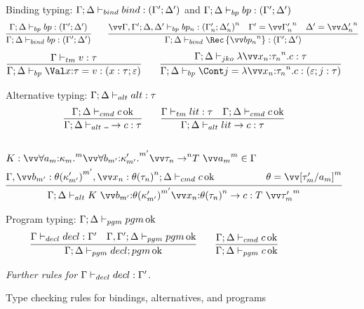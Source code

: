 \documentclass{article}
\begin{document}
\begin{figure}
\centering

Binding typing: $\Gamma; \Delta \vdash_{bind} bind : (\Gamma'; \Delta')$ and
$\Gamma; \Delta \vdash_{bp} bp : (\Gamma'; \Delta')$
\begin{gather*}
  \infer
  {\typebind{\Gamma}{\Delta}{\nonrec{\bp}}{\Gamma'}{\Delta'}}
  {\typebp{\Gamma}{\Delta}{\bp}{\Gamma'}{\Delta'}}
  \qquad
  \infer
  {
    \typebind{\Gamma}{\Delta}{\rec{\vect[n]{\bp_n}}}{\Gamma'}{\Delta'}
  }
  {
    \vect[n]{
      \typebp
      {\Gamma,\Gamma'}{\Delta,\Delta'}
      {\bp_n}
      {\Gamma'_n}{\Delta'_n}
    }
    &
    \Gamma' = \vect[n]{\Gamma'_n}
    &
    \Delta' = \vect[n]{\Delta'_n}
  }
\end{gather*}
\begin{gather*}
  \infer
  {\typebp{\Gamma}{\Delta}{\bindv{\ann x \ty}{\tm}}{x:\ty}{\mt}}
  {\typetm{\Gamma}{\tm}{\ty}}
  \qquad
  \infer
  {
    \typebp
    {\Gamma}{\Delta}
    {\bindk{j}{\fnk{\vect[n]{\ann{x_n}{\ty_n}}}\cmd}}
    {\mt}{j:\ty}
  }
  {\typejmpko{\Gamma}{\Delta}{\fnk{\vect[n]{\ann{x_n}{\ty_n}}}\cmd}{\ty}}
\end{gather*}

Alternative typing: $\Gamma; \Delta \vdash_{alt} alt : \tau$
\begin{gather*}
  \infer
  {\typealt{\Gamma}{\Delta}{\alt{\blank}{\cmd}}{\ty}}
  {\typecmd{\Gamma}{\Delta}{\cmd}}
  \qquad
  \infer
  {\typealt{\Gamma}{\Delta}{\alt{\lit}{\cmd}}{\ty}}
  {
    \typetm{\Gamma}{\lit}{\ty}
    &
    \typecmd{\Gamma}{\Delta}{\cmd}
  }
  \\\\
  \infer
  {
    \typealt
    {\Gamma}{\Delta}
    {
      \alt{
        K ~ \vect[m']{\ann{b_{m'}}{\theta(\ki'_{m'})}} \vect[n]{\ann{x_{n}}{\theta(\ty_{n})}}
      }
      {\cmd}
    }
    {T ~ \vect[m]{\ty'_m}}
  }
  {
  \begin{aligned}[b]
    &
    K
    :
    \vect[m]{\forall\ann{a_m}{\ki_m}.} \vect[m']{\forall\ann{b_{m'}}{\ki'_{m'}}.}
      \vect[n]{\ty_{n} \to} T ~ \vect[m]{a_m}
    \in
    \Gamma
    \\
    &
    \typecmd
    {\Gamma, \vect[m']{b_{m'}:\theta(\ki'_{m'})}, \vect[n]{x_{n}:\theta(\ty_{n})}}
    {\Delta}
    {\cmd}
  \end{aligned}
    &
    \theta = \vect[m]{\subst{a_m}{\ty'_m}}
  }
\end{gather*}

Program typing: $\Gamma; \Delta \vdash_{pgm} pgm \operatorname{ok}$
\begin{gather*}
  \infer
  {\typepgm{\Gamma}{\Delta}{\decl; \pgm}}
  {
    \typedecl{\Gamma}{\decl}{\Gamma'}
    &
    \typepgm{\Gamma,\Gamma'}{\Delta}{\pgm}
  }
  \qquad
  \infer
  {\typepgm{\Gamma}{\Delta}{\cmd}}
  {\typecmd{\Gamma}{\Delta}{\cmd}}
\end{gather*}

\emph{Further rules for $\Gamma \vdash_{decl} decl : \Gamma'$.}
\caption{Type checking rules for bindings, alternatives, and programs}
\label{fig:typing-rules-binds}
\end{figure}
\end{document}
